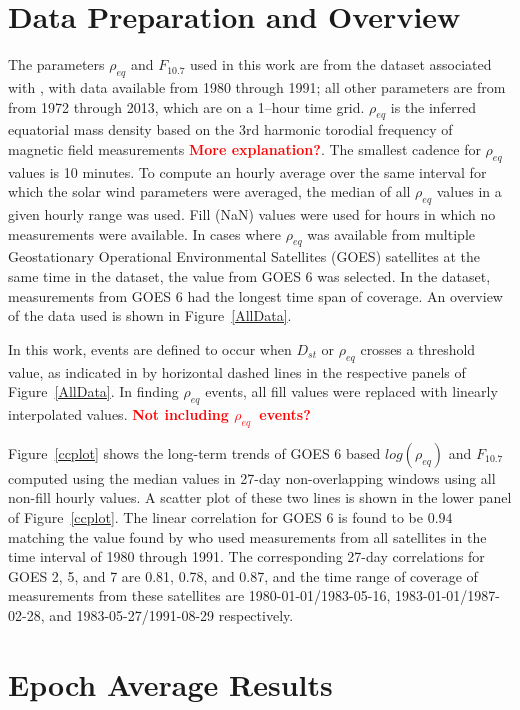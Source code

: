 \documentclass[10pt,twocolumn]{article}
\newcommand{\vinote}[1]{\textcolor{red}{\textbf{#1}}} %
\newcommand{\req}{\ensuremath{\rho_{eq}}}
\newcommand{\inote}[1]{\textcolor{blue}{\textbf{#1}}} %
\def\note#1\par{\textcolor{blue}{\textbf{#1}}\\}
\begin{document}
\section{Data Preparation and Overview}

The parameters $\rho_{eq}$ and $F_{10.7}$ used in this work are from the dataset associated with \cite{Denton}, with data available from 1980 through 1991; all other parameters are from \cite{Kondrashov2014ReconstructionOfGaps} from 1972 through 2013, which are on a 1--hour time grid. $\rho_{eq}$ is the inferred equatorial mass density based on the 3rd harmonic torodial frequency of magnetic field measurements \vinote{More explanation?}.  The smallest cadence for $\rho_{eq}$ values is 10 minutes.  To compute an hourly average over the same interval for which the solar wind parameters were averaged, the median of all $\rho_{eq}$ values in a given hourly range was used.  Fill (NaN) values were used for hours in which no measurements were available.  In cases where $\rho_{eq}$ was available from multiple Geostationary Operational Environmental Satellites (GOES) satellites at the same time in the \cite{Denton} dataset, the value from GOES 6 was selected.  In the dataset, measurements from GOES 6 had the longest time span of coverage.  An overview of the data used is shown in Figure~\ref{AllData}.

In this work, events are defined to occur when $D_{st}$ or $\rho_{eq}$ crosses a threshold value, as indicated in by horizontal dashed lines in the respective panels of Figure~\ref{AllData}.  In finding $\rho_{eq}$ events, all fill values were replaced with linearly interpolated values. \vinote{Not including \req\ events?}

Figure~\ref{ccplot} shows the long-term trends of GOES 6 based $log(\rho_{eq})$ and $F_{10.7}$ computed using the median values in 27-day non-overlapping windows using all non-fill hourly values.  A scatter plot of these two lines is shown in the lower panel of Figure~\ref{ccplot}.  The linear correlation for GOES 6 is found to be $0.94$ matching the value found by \cite{Takahashi2010} who used measurements from all satellites in the time interval of 1980 through 1991.  The corresponding 27-day correlations for GOES 2, 5, and 7 are 0.81, 0.78, and 0.87, and the time range of coverage of measurements from these satellites are 1980-01-01/1983-05-16, 1983-01-01/1987-02-28, and 1983-05-27/1991-08-29 respectively.

\section{Epoch Average Results}
\end{document}
